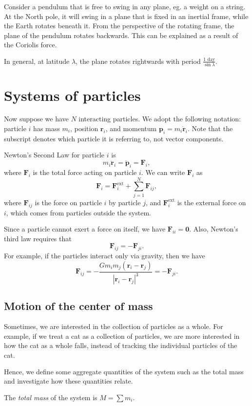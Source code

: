 \documentclass[a4paper]{article}
\begin{document}
\begin{eg}
  Consider a pendulum that is free to swing in any plane, eg. a weight on a string. At the North pole, it will swing in a plane that is fixed in an inertial frame, while the Earth rotates beneath it. From the perspective of the rotating frame, the plane of the pendulum rotates backwards. This can be explained as a result of the Coriolis force.

  In general, at latitude $\lambda$, the plane rotates rightwards with period $\frac{1\text{ day}}{\sin \lambda}$.
\end{eg}

\section{Systems of particles}
Now suppose we have $N$ interacting particles. We adopt the following notation: particle $i$ has mass $m_i$, position $\mathbf{r}_i$, and momentum $\mathbf{p}_i = m_i \dot{\mathbf{r}}_i$. Note that the subscript denotes which particle it is referring to, not vector components.

Newton's Second Law for particle $i$ is
\[
  m_i \ddot{\mathbf{r}}_i = \dot{\mathbf{p}}_i = \mathbf{F}_i,
\]
where $\mathbf{F}_i$ is the total force acting on particle $i$. We can write $\mathbf{F}_i$ as
\[
  \mathbf{F}_i = \mathbf{F}_i^{\text{ext}} + \sum_{j = 1}^N \mathbf{F}_{ij},
\]
where $\mathbf{F}_{ij}$ is the force on particle $i$ by particle $j$, and $\mathbf{F}_i^{\text{ext}}$ is the external force on $i$, which comes from particles outside the system.

Since a particle cannot exert a force on itself, we have $\mathbf{F}_{ii} = \mathbf{0}$. Also, Newton's third law requires that
\[
  \mathbf{F}_{ij} = -\mathbf{F}_{ji}.
\]
For example, if the particles interact only via gravity, then we have
\[
  \mathbf{F}_{ij} = -\frac{Gm_im_j(\mathbf{r}_i - \mathbf{r}_j)}{|\mathbf{r}_i - \mathbf{r}_j|^3} = -\mathbf{F}_{ji}.
\]
\subsection{Motion of the center of mass}
Sometimes, we are interested in the collection of particles as a whole. For example, if we treat a cat as a collection of particles, we are more interested in how the cat as a whole falls, instead of tracking the individual particles of the cat.

Hence, we define some aggregate quantities of the system such as the total mass and investigate how these quantities relate.
\begin{defi}
  The \emph{total mass} of the system is $M = \sum m_i$.
\end{defi}
\end{document}
